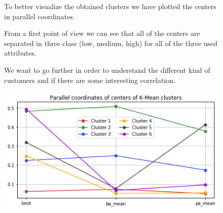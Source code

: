 \begin{figure}[h]
  \begin{minipage}[h]{.40\textwidth}
    To better visualize the obtained clusters we have plotted the centers in parallel coordinates.
    
  From a first point of view we can see that all of the centers are separated in three class (low, medium, high) for all of the three used attributes.
  
  We want to go further in order to understand the different kind of customers and if there are some interesting correlation.
  \end{minipage}
    \begin{minipage}[h]{.60\textwidth}
    \includegraphics[width=.9\textwidth]{img/ch3/kmeans_center}
  \end{minipage}
\end{figure}

\clearpage


